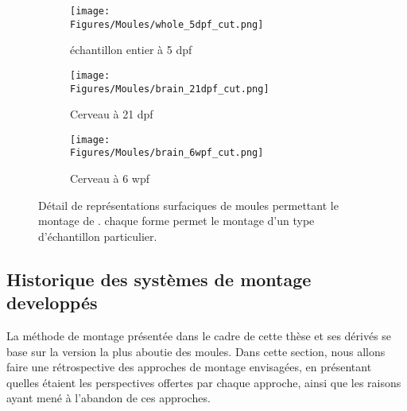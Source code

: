 \documentclass[\main/main.tex]{subfiles}
\begin{document}
\begin{figure}[htbp]
    \centering
    \begin{subfigure}[b]{0.37674418604651162790697674418605\textwidth}
       \caption{
            \label{fig:formes:whole_5dpf}
            échantillon entier à 5 dpf
            }
       \centering \texttt{[image: \\Figures/Moules/whole\_5dpf\_cut.png]}
    \end{subfigure}
    \begin{subfigure}[b]{0.26162790697674418604651162790698\textwidth}
       \caption{
            \label{fig:formes:brain_21dpf}
            Cerveau à 21 dpf
            }
       \centering \texttt{[image: \\Figures/Moules/brain\_21dpf\_cut.png]}
    \end{subfigure}
    \begin{subfigure}[b]{0.26162790697674418604651162790698\textwidth}
       \caption{
            \label{fig:formes:brain_6wpf}
            Cerveau à 6 wpf
            }
       \centering \texttt{[image: \\Figures/Moules/brain\_6wpf\_cut.png]}
    \end{subfigure}
    \caption{
        \label{fig:formes}
        Détail de représentations surfaciques de moules permettant le montage de \pzs. chaque forme permet le montage d'un type d'échantillon particulier.
    }
    
\end{figure}
    
    \subsection{Historique des systèmes de montage developpés}
 
%
La méthode de montage présentée dans le cadre de cette thèse et ses dérivés se base sur la version la plus aboutie des moules.
%
Dans cette section, nous allons faire une rétrospective des approches de montage envisagées, en présentant quelles étaient les perspectives offertes par chaque approche, ainsi que les raisons ayant mené à l'abandon de ces approches.
\end{document}
